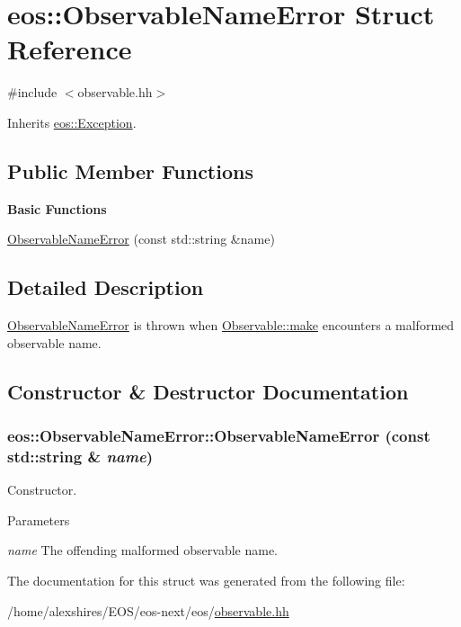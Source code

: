 \hypertarget{structeos_1_1ObservableNameError}{
\section{eos::ObservableNameError Struct Reference}
\label{structeos_1_1ObservableNameError}
}


{\ttfamily \#include $<$observable.hh$>$}

Inherits \hyperlink{classeos_1_1Exception}{eos::Exception}.\subsection*{Public Member Functions}
\begin{Indent}{\bf Basic Functions}\par
{\em \label{_amgrp2386c9a1f1785edee33f374dd2db9b3d}
 }\begin{DoxyCompactItemize}
\item 
\hyperlink{structeos_1_1ObservableNameError_a72151a228a9a366564fdde0bef5e7b30}{ObservableNameError} (const std::string \&name)
\end{DoxyCompactItemize}
\end{Indent}


\subsection{Detailed Description}
\hyperlink{structeos_1_1ObservableNameError}{ObservableNameError} is thrown when \hyperlink{classeos_1_1Observable_a949bf84938bcc9ab75075801c636763c}{Observable::make} encounters a malformed observable name. 

\subsection{Constructor \& Destructor Documentation}
\hypertarget{structeos_1_1ObservableNameError_a72151a228a9a366564fdde0bef5e7b30}{
\subsubsection[{ObservableNameError}]{\setlength{\rightskip}{0pt plus 5cm}eos::ObservableNameError::ObservableNameError (const std::string \& {\em name})}}
\label{structeos_1_1ObservableNameError_a72151a228a9a366564fdde0bef5e7b30}
Constructor.


\begin{DoxyParams}{Parameters}
\item[{\em name}]The offending malformed observable name. \end{DoxyParams}


The documentation for this struct was generated from the following file:\begin{DoxyCompactItemize}
\item 
/home/alexshires/EOS/eos-\/next/eos/\hyperlink{observable_8hh}{observable.hh}\end{DoxyCompactItemize}
